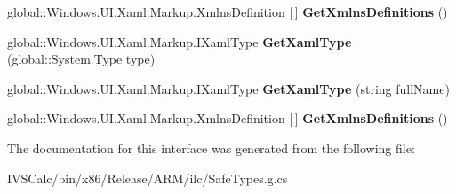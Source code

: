 \begin{DoxyCompactItemize}
\mbox{\label{interface_windows_1_1_u_i_1_1_xaml_1_1_markup_1_1_i_xaml_metadata_provider_a8ae18d0fbda9e17c4168690ffc4d81ee}} 
global\+::\+Windows.\+U\+I.\+Xaml.\+Markup.\+Xmlns\+Definition \mbox{[}$\,$\mbox{]} {\bfseries Get\+Xmlns\+Definitions} ()
\item 
\mbox{\label{interface_windows_1_1_u_i_1_1_xaml_1_1_markup_1_1_i_xaml_metadata_provider_a377ff409aeef7809629e89922b5c7c04}} 
global\+::\+Windows.\+U\+I.\+Xaml.\+Markup.\+I\+Xaml\+Type {\bfseries Get\+Xaml\+Type} (global\+::\+System.\+Type type)
\item 
\mbox{\label{interface_windows_1_1_u_i_1_1_xaml_1_1_markup_1_1_i_xaml_metadata_provider_ae30d4bd18a8682dafecc626a2d444d1f}} 
global\+::\+Windows.\+U\+I.\+Xaml.\+Markup.\+I\+Xaml\+Type {\bfseries Get\+Xaml\+Type} (string full\+Name)
\item 
\mbox{\label{interface_windows_1_1_u_i_1_1_xaml_1_1_markup_1_1_i_xaml_metadata_provider_a8ae18d0fbda9e17c4168690ffc4d81ee}} 
global\+::\+Windows.\+U\+I.\+Xaml.\+Markup.\+Xmlns\+Definition \mbox{[}$\,$\mbox{]} {\bfseries Get\+Xmlns\+Definitions} ()
\end{DoxyCompactItemize}


The documentation for this interface was generated from the following file\+:\begin{DoxyCompactItemize}
\item 
I\+V\+S\+Calc/bin/x86/\+Release/\+A\+R\+M/ilc/Safe\+Types.\+g.\+cs\end{DoxyCompactItemize}
